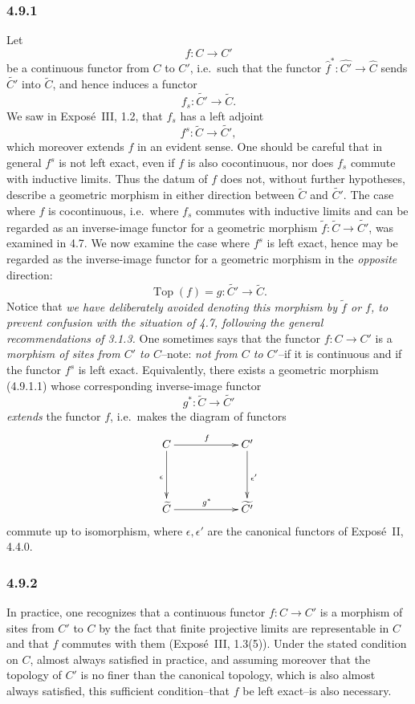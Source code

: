 \documentclass[11pt]{article}
\newcommand{\Top}{\operatorname{Top}}
\newcommand{\ie}{i.e.}
\begin{document}
\subsubsection*{4.9.1}
Let
\[
f:C\longrightarrow C'
\]
be a continuous functor from \(C\) to \(C'\), \ie\ such that the functor \(\widehat f^\ast:\widehat{C'}\to\widehat C\) sends \(\widetilde{C'}\) into \(\widetilde C\), and hence induces a functor
\[
f_s:\widetilde{C'}\longrightarrow\widetilde C.
\]
We saw in Expos\'e~III, 1.2, that \(f_s\) has a left adjoint
\[
f^s:\widetilde C\longrightarrow\widetilde{C'},
\]
which moreover extends \(f\) in an evident sense. One should be careful that in general \(f^s\) is not left exact, even if \(f\) is also cocontinuous, nor does \(f_s\) commute with inductive limits. Thus the datum of \(f\) does not, without further hypotheses, describe a geometric morphism in either direction between \(\widetilde C\) and \(\widetilde{C'}\). The case where \(f\) is cocontinuous, \ie\ where \(f_s\) commutes with inductive limits and can be regarded as an inverse-image functor for a geometric morphism \(\widetilde f:\widetilde C\to\widetilde{C'}\), was examined in 4.7. We now examine the case where \(f^s\) is left exact, hence may be regarded as the inverse-image functor for a geometric morphism in the \emph{opposite} direction:
\[
\Top(f)=g:\widetilde{C'}\longrightarrow\widetilde C.\tag{4.9.1.1}
\]
Notice that \emph{we have deliberately avoided denoting this morphism by \(\widetilde f\) or \(f\), to prevent confusion with the situation of 4.7, following the general recommendations of 3.1.3.} One sometimes says that the functor \(f:C\to C'\) is a \emph{morphism of sites from \(C'\) to \(C\)}--note: \emph{not from \(C\) to \(C'\)}--if it is continuous and if the functor \(f^s\) is left exact. Equivalently, there exists a geometric morphism (4.9.1.1) whose corresponding inverse-image functor
\[
g^\ast:\widetilde C\longrightarrow\widetilde{C'}
\]
\emph{extends} the functor \(f\), \ie\ makes the diagram of functors
\[
\xymatrix@C=2cm@R=1.5cm{
C \ar[d]_{\epsilon}\ar[r]^f & C'\ar[d]^{\epsilon'}\\
\widetilde C \ar[r]^{g^\ast} & \widetilde{C'}
}
\]
commute up to isomorphism, where \(\epsilon,\epsilon'\) are the canonical functors of Expos\'e~II, 4.4.0.

\subsubsection*{4.9.2}
In practice, one recognizes that a continuous functor \(f:C\to C'\) is a morphism of sites from \(C'\) to \(C\) by the fact that finite projective limits are representable in \(C\) and that \(f\) commutes with them (Expos\'e~III, 1.3(5)). Under the stated condition on \(C\), almost always satisfied in practice, and assuming moreover that the topology of \(C'\) is no finer than the canonical topology, which is also almost always satisfied, this sufficient condition--that \(f\) be left exact--is also necessary.
\end{document}

